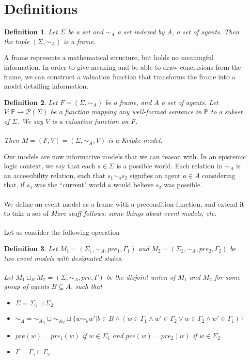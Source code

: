 \documentclass[12pt, a4paper, titlepage]{scrartcl}
\newcommand{\aRel}[1] {
  \sim_{#1} 
}
\newcommand{\kripkeFrame}[2] {
  (#1, \aRel{#2})
}
\newcommand{\kripkeModel}[3] {
  (#1, \aRel{#2}, #3)
}
\newcommand{\frKripModel}[2] { %
  (#1, #2)
}
\newcommand{\actModelStates}[4] {
	(#1, \aRel{#2}, #3, #4)
}
\newtheorem{defn}{Definition}
\begin{document}
\section{Definitions}

\begin{defn} \label{frame}
	Let $\Sigma$ be a set and $\aRel{A}$ a set indexed by $A$, a set of agents.
	Then the tuple $\kripkeFrame{\Sigma}{A}$ is a frame.
\end{defn}

A frame represents a mathematical structure, but holds no meaningful information.
In order to give meaning and be able to draw conclusions from the frame, we can
construct a valuation function that transforms the frame into a model detailing
information.
\begin{defn} \label{model}
	Let $F = \kripkeFrame{\Sigma}{A}$ be a frame, and $A$ a set of agents.
	Let $V: \mathbb{P} \to \mathcal{P}(\Sigma)$ be a function mapping any
	well-formed	sentence in $\mathbb{P}$ to a subset of $\Sigma$.
	We say $V$ is a valuation function on $F$.\\
	\\
	Then $M = \frKripModel{F}{V} = \kripkeModel{\Sigma}{A}{V}$ is a Kripke
	model.
\end{defn}

Our models are now informative models that we can reason with.
In an epistemic logic context, we say that each $s \in \Sigma$ is a possible
world.
Each relation in $\aRel{A}$ is an accessibility relation, such that $s_1 \sim_a
s_2$ signifies an agent $a \in A$ considering that, if $s_1$ was the ``current"
world $a$ would believe $s_2$ was possible.\\
\\
We define an event model as a frame with a precondition function, and extend it
to take a set of 
{\em More stuff follows: some things about event models, etc.}\\
\\
Let us consider the following operation

\begin{defn} \label{gen_union_1}
	Let $M_1 = \actModelStates{\Sigma_1}{A}{pre_1}{\Gamma_1}$ and $M_2 =
	\actModelStates{\Sigma_2}{A}{pre_2}{\Gamma_2}$ be two event models with
	designated states.\\
	\\
	Let $M_1 \sqcup_B M_2 = \actModelStates{\Sigma}{A}{pre}{\Gamma}$ be the disjoint
	union of $M_1$ and $M_2$ for some group	of agents $B \subseteq A$, such that
	\begin{itemize}
		\item $\Sigma = \Sigma_1 \sqcup \Sigma_2$
		\item $\aRel{A} = {\aRel{A}}_1 \sqcup {\aRel{A}}_2 \sqcup \{w \sim_b w' | b \in
		B \land (w \in \Gamma_1 \land w' \in \Gamma_2 \lor w \in \Gamma_2 \land w' \in \Gamma_1)\}$
		\item $pre(w) = pre_1(w)$ if $w \in \Sigma_1$ and $pre(w) = pre_2(w)$ if $w
		\in \Sigma_2$
		\item $\Gamma = \Gamma_1 \sqcup \Gamma_2$
	\end{itemize}
\end{defn}
\end{document}
